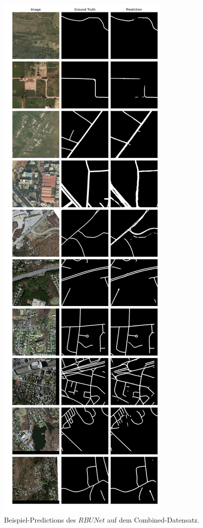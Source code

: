 \begin{figure}
	\centering
	\includegraphics[width=.41\textwidth]{Bilder/Samples-Combined/rbunet.png}
	\caption{Beispiel-Predictions des $RBUNet$ auf dem Combined-Datensatz.}
	\label{fig:combined-samples-rbunet}
\end{figure}

